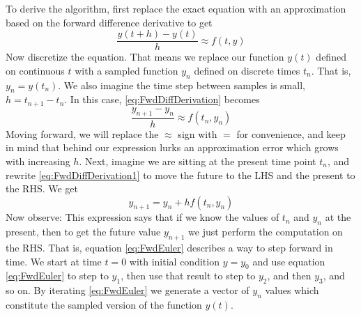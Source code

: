 \documentclass[hidelinks,notitlepage]{book}
\begin{document}
To derive the algorithm, first replace the exact equation with an approximation based on the forward difference derivative to get
\begin{equation}
\label{eq:FwdDiffDerivation}
\frac{y(t + h) - y(t)}{h} \approx f(t, y) 
\end{equation}
Now discretize the equation.  That means we replace our function $y(t)$ defined on continuous $t$ with a sampled function $y_n$ defined on discrete times $t_n$.  That is, $y_n = y(t_n)$.  We also imagine the time step between samples is small, $h = t_{n+1} - t_n$.  In this case, \cref{eq:FwdDiffDerivation} becomes
\begin{equation}
\label{eq:FwdDiffDerivation1}
\frac{y_{n+1} - y_n}{h} \approx f(t_n, y_n) 
\end{equation}
Moving forward, we will replace the $\approx$ sign with $=$ for convenience, and keep in mind that behind our expression lurks an approximation error which grows with increasing $h$.  Next, imagine we are sitting at the present time point $t_n$, and rewrite \cref{eq:FwdDiffDerivation1} to move the future to the LHS and the present to the RHS.  We get
\begin{equation}
\label{eq:FwdEuler}
y_{n+1} = y_n + h f(t_n, y_n)
\end{equation}
Now observe:  This expression says that if we know the values of $t_n$ and $y_n$ at the present, then to get the future value $y_{n+1}$ we just perform the computation on the RHS.  That is, equation \cref{eq:FwdEuler} describes a way to step forward in time.  We start at time $t=0$ with initial condition $y = y_0$ and use equation \cref{eq:FwdEuler} to step to $y_1$, then use that result to step to $y_2$, and then $y_3$, and so on.  By iterating \cref{eq:FwdEuler} we generate a vector of $y_n$ values which constitute the sampled version of the function $y(t)$.
\end{document}
